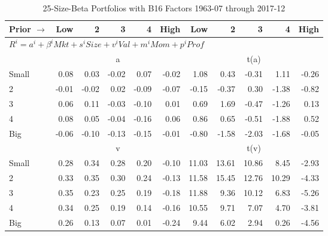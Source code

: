 
\begin{table}[!ht]
\footnotesize
\centering
\caption{25-Size-Beta Portfolios with B16 Factors 1963-07 through 2017-12}
\begin{tabular}{lrrrrrrrrrr}
  \toprule
    Prior $\rightarrow$ & Low & 2 & 3 & 4 & High & Low & 2 & 3 & 4 & High \\ 
  \midrule
  \multicolumn{11}{l}{$R^i=a^i+\beta^iMkt+s^iSize+v^iVal+m^iMom+p^iProf$} \\

  
    
      & \multicolumn{5}{c}{a} & \multicolumn{5}{c}{t(a)}
    
    \\
      \cmidrule(r){2-6} \cmidrule(r){7-11}

    Small   & 0.08  & 0.03  & -0.02  & 0.07  & -0.02  & 1.08  & 0.43  & -0.31  & 1.11  & -0.26  \\
         2  & -0.01  & -0.02  & 0.02  & -0.09  & -0.07  & -0.15  & -0.37  & 0.30  & -1.38  & -0.82  \\
         3  & 0.06  & 0.11  & -0.03  & -0.10  & 0.01  & 0.69  & 1.69  & -0.47  & -1.26  & 0.13  \\
         4  & 0.08  & 0.05  & -0.04  & -0.16  & 0.06  & 0.86  & 0.65  & -0.51  & -1.88  & 0.52  \\
    Big     & -0.06  & -0.10  & -0.13  & -0.15  & -0.01  & -0.80  & -1.58  & -2.03  & -1.68  & -0.05  \\

  
    
      & \multicolumn{5}{c}{v} & \multicolumn{5}{c}{t(v)}
    
    \\
      \cmidrule(r){2-6} \cmidrule(r){7-11}

    Small   & 0.28  & 0.34  & 0.28  & 0.20  & -0.10  & 11.03  & 13.61  & 10.86  & 8.45  & -2.93  \\
         2  & 0.33  & 0.35  & 0.30  & 0.24  & -0.13  & 11.58  & 15.45  & 12.76  & 10.29  & -4.33  \\
         3  & 0.35  & 0.23  & 0.25  & 0.19  & -0.18  & 11.88  & 9.36  & 10.12  & 6.83  & -5.26  \\
         4  & 0.34  & 0.25  & 0.19  & 0.14  & -0.16  & 10.55  & 9.71  & 7.07  & 4.70  & -3.81  \\
    Big     & 0.26  & 0.13  & 0.07  & 0.01  & -0.24  & 9.44  & 6.02  & 2.94  & 0.26  & -4.56  \\

  
    

\end{tabular}
\end{table}
